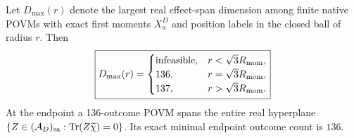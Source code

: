 \documentclass[12pt,a4paper]{article}
\begin{document}
\begin{theorem}
\label{p2c:thm:v354-exact-native-rank}
Let $D_{\max}(r)$ denote the largest real effect-span dimension
among finite native POVMs with exact first moments $X_a^D$ and
position labels in the closed ball of radius $r$. Then
\[
\boxed{
D_{\max}(r)=
\begin{cases}
\text{infeasible}, & r<\sqrt3R_{\rm mom},\\
136, & r=\sqrt3R_{\rm mom},\\
137, & r>\sqrt3R_{\rm mom}.
\end{cases}}
\]
At the endpoint a 136-outcome POVM spans the entire real hyperplane
$\{Z\in(\mathcal A_D)_{\rm sa}:\operatorname{Tr}(Z\widetilde\chi)=0\}$.
Its exact minimal endpoint outcome count is $\boxed{136}$.
\end{theorem}
\end{document}
